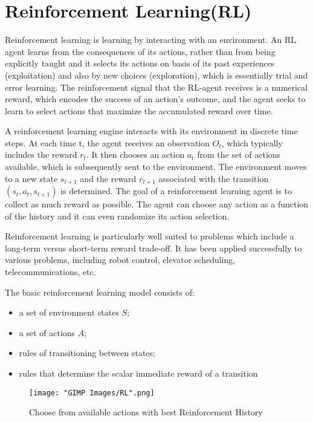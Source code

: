 \documentclass[12pt]{report}
\begin{document}
\section{Reinforcement Learning(RL)}
Reinforcement learning is learning by interacting with an environment. An RL agent learns from the consequences of its actions, rather than from being explicitly taught and it selects its actions on basis of its past experiences (exploitation) and also by new choices (exploration), which is essentially trial and error learning. The reinforcement signal that the RL-agent receives is a numerical reward, which encodes the success of an action's outcome, and the agent seeks to learn to select actions that maximize the accumulated reward over time.\par
A reinforcement learning engine interacts with its environment in discrete time steps. At each time t, the agent receives an observation $O_t$, which typically includes the reward $r_t$. It then chooses an action $a_t$ from the set of actions available, which is subsequently sent to the environment. The environment moves to a new state $s_{t+1}$ and the reward $r_{t+1}$ associated with the transition $(s_t,a_t,s_{t+1})$ is determined. The goal of a reinforcement learning agent is to collect as much reward as possible. The agent can choose any action as a function of the history and it can even randomize its action selection.  \par
Reinforcement learning is particularly well suited to problems which include a long-term versus short-term reward trade-off. It has been applied successfully to various problems, including robot control, elevator scheduling, telecommunications, etc. \par
The basic reinforcement learning model consists of:
\begin{itemize}
    \item a set of environment states $S$;
    \item a set of actions $A$;
    \item rules of transitioning between states;
    \item rules that determine the scalar immediate reward of a transition
\end{itemize}

\begin{figure}[h]
  \centering
  \texttt{[image: "GIMP Images/RL".png]}
  \caption{Choose from available actions with best Reinforcement History}
  \label{fig:RL}
\end{figure}
\end{document}
